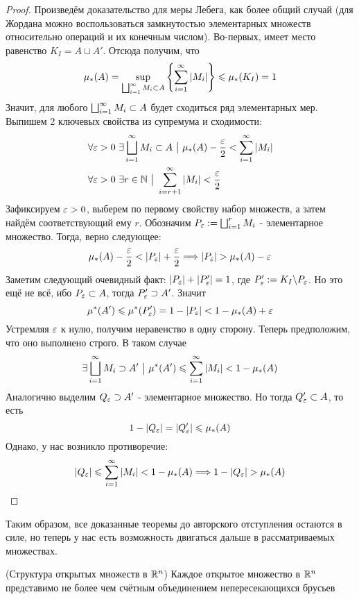 \begin{proof}
	Произведём доказательство для меры Лебега, как более общий случай (для Жордана можно воспользоваться замкнутостью элементарных множеств относительно операций и их конечным числом). Во-первых, имеет место равенство $K_I = A \sqcup A'$. Отсюда получим, что
	\[
		\mu_*(A) = \sup_{\bigsqcup_{i = 1}^\infty M_i \subset A} \left\{\sum_{i = 1}^\infty |M_i|\right\} \leqslant \mu_*(K_I) = 1
	\]
	Значит, для любого $\bigsqcup_{i = 1}^\infty M_i \subset A$ будет сходиться ряд элементарных мер. Выпишем 2 ключевых свойства из супремума и сходимости:
	\begin{align*}
		&{\forall \varepsilon > 0\ \exists \bigsqcup_{i = 1}^\infty M_i \subset A \ \big|\  \mu_*(A) - \frac{\varepsilon}{2} < \sum_{i = 1}^\infty |M_i|}
		\\
		&{\forall \varepsilon > 0\ \exists r \in \mathbb{N} \ \big|\  \sum_{i = r + 1}^\infty |M_i| < \frac{\varepsilon}{2}}
	\end{align*}
	Зафиксируем $\varepsilon > 0$, выберем по первому свойству набор множеств, а затем найдём соответствующий ему $r$. Обозначим $P_\varepsilon := \bigsqcup_{i = 1}^r M_i$ - элементарное множество. Тогда, верно следующее:
	\[
		\mu_*(A) - \frac{\varepsilon}{2} < |P_\varepsilon| + \frac{\varepsilon}{2} \Longrightarrow |P_\varepsilon| > \mu_*(A) - \varepsilon
	\]
	Заметим следующий очевидный факт: $|P_\varepsilon| + |P'_\varepsilon| = 1$, где $P'_\varepsilon := K_I \backslash P_\varepsilon$. Но это ещё не всё, ибо $P_\varepsilon \subset A$, тогда $P'_\varepsilon \supset A'$. Значит
	\[
		\mu^*(A') \leqslant \mu^*(P'_\varepsilon) = 1 - |P_\varepsilon| < 1 - \mu_*(A) + \varepsilon
	\]
	Устремляя $\varepsilon$ к нулю, получим неравенство в одну сторону. Теперь предположим, что оно выполнено строго. В таком случае
	\[
		\exists \bigsqcup_{i = 1}^\infty M_i \supset A' \ \big|\  \mu^*(A') \leqslant \sum_{i = 1}^\infty |M_i| < 1 - \mu_*(A)
	\]
	Аналогично выделим $Q_\varepsilon \supset A'$ - элементарное множество. Но тогда $Q'_\varepsilon \subset A$, то есть
	\[
		1 - |Q_\varepsilon| = |Q'_\varepsilon| \leqslant \mu_*(A)
	\]
	Однако, у нас возникло противоречие:
	\[
		|Q_\varepsilon| \leqslant \sum_{i = 1}^\infty |M_i| < 1 - \mu_*(A) \Longrightarrow 1 - |Q_\varepsilon| > \mu_*(A)
	\]
\end{proof}

\begin{anote}
	Таким образом, все доказанные теоремы до авторского отступления остаются в силе, но теперь у нас есть возможность двигаться дальше в рассматриваемых множествах.
\end{anote}

\begin{theorem} (Структура открытых множеств в $\mathbb{R}^n$)
	Каждое открытое множество в $\mathbb{R}^n$ представимо не более чем счётным объединением непересекающихся брусьев
\end{theorem}

